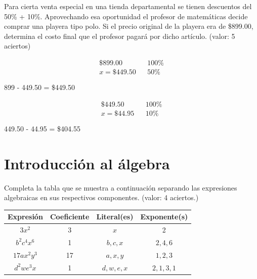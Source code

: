 \documentclass[11pt]{article}
\begin{document}
\vspace{3cm}

Para cierta venta especial en una tienda departamental se tienen descuentos del
50\% + 10\%. Aprovechando esa oportunidad el profesor de matem\'aticas decide
comprar una playera tipo polo. Si el precio original de la playera era de
\$899.00,  determina el costo final que el profesor pagar\'a por dicho
art\'iculo. (valor: 5 aciertos)

\begin{minipage}[t]{0.5\textwidth}
    \begin{eqnarray*}
        \$899.00&   &100\% \\
        x=\$449.50&  &50\% \\ \\
    \end{eqnarray*}
    899 - 449.50 = \$449.50
\end{minipage}%
\begin{minipage}[t]{0.5\textwidth}
    \begin{eqnarray*}
        \$449.50&   &100\% \\
        x=\$44.95&  &10\% \\ \\
    \end{eqnarray*}
    449.50 - 44.95 = \$404.55
\end{minipage}

\vspace{3cm}

\newpage

\section{Introducci\'on al \'algebra}


Completa la tabla que se muestra a continuaci\'on separando las expresiones
algebraicas en sus respectivos componentes. (valor: 4 aciertos.)

\begin{center}
\bgroup
\def\arraystretch{2}
\begin{tabular}{|c|c|c|c|}
\hline
Expresi\'on & Coeficiente & Literal(es) & Exponente(s)  \\ \hline 
$3x^2$ &3 &$x$ &2\\ \hline
$b^2c^4x^6$ &1 &$b,c,x$   &$2,4,6$\\ \hline
$17ax^2y^3$ &17 &$a,x,y$  &$1,2,3$\\ \hline
$d^2we^3x$  &1 &$d,w,e,x$ &$2,1,3,1$\\ \hline
\end{tabular}
\egroup
\end{center}
\end{document}
